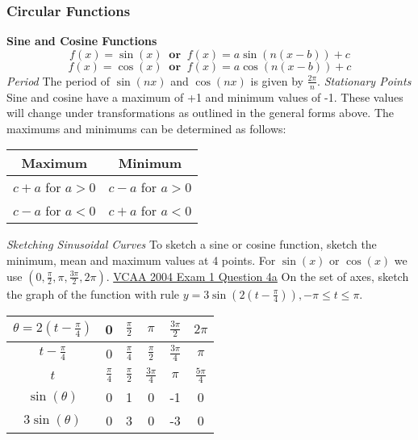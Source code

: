 \documentclass{article}
\begin{document}
			\subsubsection{Circular Functions}
				\textbf{Sine and Cosine Functions}
				\[f(x)=\sin(x)\;\;\mathbf{or}\;\;f(x)=a\sin(n(x-b))+c\]
				\[f(x)=\cos(x)\;\;\mathbf{or}\;\;f(x)=a\cos(n(x-b))+c\]
				\textit{Period}\newline
				The period of $\sin(nx)$ and $\cos(nx)$ is given by $\frac{2\pi}{n}$.\newline\newline
				\textit{Stationary Points}\newline
				Sine and cosine have a maximum of +1 and minimum values of -1. These values will change under transformations as outlined in the general forms above. The maximums and minimums can be determined as follows: \newline
				\bgroup
				\def\arraystretch{1.5}
				\begin{center}	
					\begin{tabular}{|c|c|}
						\hline
						Maximum & Minimum \\
						\hline
						$c+a$ for $a>0$ & $c-a$ for $a>0$ \\
						\hline
						$c-a$ for $a<0$ & $c+a$ for $a<0$ \\
						\hline
					\end{tabular}
				\end{center}
				\egroup
				\noindent\textit{Sketching Sinusoidal Curves}\newline
				To sketch a sine or cosine function, sketch the minimum, mean and maximum values at 4 points. For $\sin(x)$ or $\cos(x)$ we use $(0,\frac{\pi}{2},\pi,\frac{3\pi}{2},2\pi)$.\newline\newline
				\underline{VCAA 2004 Exam 1 Question 4a}\newline
				On the set of axes, sketch the graph of the function with rule $y=3\sin\left(2\left(t-\frac{\pi}{4}\right)\right),-\pi\le t\le\pi$.\newline
				\bgroup
				\def\arraystretch{1.5}
				\begin{tabular}{|c|c|c|c|c|c|}
					\hline
					$\theta=2\left(t-\frac{\pi}{4}\right)$ & 0 & $\frac{\pi}{2}$ & $\pi$ & $\frac{3\pi}{2}$ & $2\pi$ \\
					\hline
					$t-\frac{\pi}{4}$ & 0 & $\frac{\pi}{4}$ & $\frac{\pi}{2}$ & $\frac{3\pi}{4}$ & $\pi$ \\
					\hline
					$t$ & $\frac{\pi}{4}$ & $\frac{\pi}{2}$ & $\frac{3\pi}{4}$ & $\pi$ & $\frac{5\pi}{4}$ \\
					\hline
					$\sin(\theta)$ & 0 & 1 & 0 & -1 & 0 \\
					\hline
					$3\sin(\theta)$ & 0 & 3 & 0 & -3 & 0 \\
					\hline
				\end{tabular}\hfill
\end{document}
